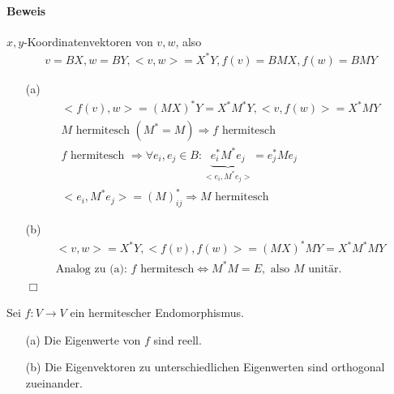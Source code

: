\paragraph{Beweis}
$x, y$-Koordinatenvektoren von $v, w$, also
\begin{align}
v = BX, w = BY, <v, w> = X^{*}Y, f(v) = BMX, f(w) = BMY
\end{align}
\begin{itemize}
\item[(a)] 
\begin{align}
<f(v), w> = (MX)^{*}Y = X^{*} M^{*} Y, <v, f(w)> = X^{*} M Y \\
M \text{ hermitesch } (M^{*} = M) \Rightarrow f \text{ hermitesch} \\
f \text{ hermitesch } \Rightarrow \forall e_i, e_j \in B: \underbrace{e_i^{*} M^{*} e_j}_{<e_i, M^{*} e_j>} = e_j^{*} Me_j \\
<e_i, M^{*} e_j> = (M)^{*}_{ij} \Rightarrow M \text{ hermitesch}
\end{align}

\item[(b)] 
\begin{align}
<v, w> = X^{*} Y, <f(v), f(w)> = (MX)^{*} MY = X^{*} M^{*} M Y \\
\text{Analog zu (a): } f \text{ hermitesch} \Leftrightarrow M^{*} M = E, \text{ also } M \text{ unitär.}
\end{align}
\hspace*{1cm} \hfill $\Box$
\end{itemize}

\begin{satz} %
\label{satz552}
Sei $f: V \rightarrow V$ ein hermitescher Endomorphismus.
\begin{itemize}
\item[(a)] Die Eigenwerte von $f$ sind reell.
\item[(b)] Die Eigenvektoren zu unterschiedlichen Eigenwerten sind orthogonal zueinander.
\end{itemize}
\end{satz}

